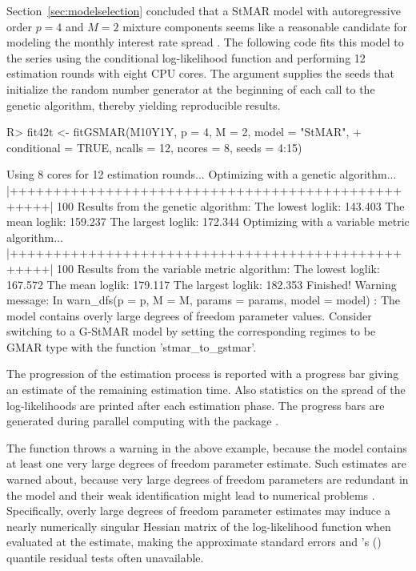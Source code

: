 \documentclass[nojss]{jss} %
\begin{document}
Section~\ref{sec:modelselection} concluded that a StMAR model with autoregressive order $p=4$ and $M=2$ mixture components seems like a reasonable candidate for modeling the monthly interest rate spread . The following code fits this model to the series using the conditional log-likelihood function and performing 12 estimation rounds with eight CPU cores. The argument  supplies the seeds that initialize the random number generator at the beginning of each call to the genetic algorithm, thereby yielding reproducible results.
%
\begin{CodeChunk}
\begin{CodeInput}
R> fit42t <- fitGSMAR(M10Y1Y, p = 4, M = 2, model = "StMAR",
+    conditional = TRUE, ncalls = 12, ncores = 8, seeds = 4:15)
\end{CodeInput}
\begin{CodeOutput}
Using 8 cores for 12 estimation rounds...
Optimizing with a genetic algorithm...
  |++++++++++++++++++++++++++++++++++++++++++++++++++| 100%
Results from the genetic algorithm:
The lowest loglik:  143.403
The mean loglik:    159.237
The largest loglik: 172.344
Optimizing with a variable metric algorithm...
  |++++++++++++++++++++++++++++++++++++++++++++++++++| 100%
Results from the variable metric algorithm:
The lowest loglik:  167.572
The mean loglik:    179.117
The largest loglik: 182.353
Finished!
Warning message:
In warn_dfs(p = p, M = M, params = params, model = model) :
  The model contains overly large degrees of freedom parameter values.
  Consider switching to a G-StMAR model by setting the corresponding regimes
  to be GMAR type with the function 'stmar_to_gstmar'.
\end{CodeOutput}
\end{CodeChunk}
%
The progression of the estimation process is reported with a progress bar giving an estimate of the remaining estimation time. Also statistics on the spread of the log-likelihoods are printed after each estimation phase. The progress bars are generated during parallel computing with the package  \citep{Solymos+Zawadzki:2020}.

The function throws a warning in the above example, because the model contains at least one very large degrees of freedom parameter estimate. Such estimates are warned about, because very large degrees of freedom parameters are redundant in the model and their weak identification might lead to numerical problems \citep[Section 4]{Virolainen:2020}. Specifically, overly large degrees of freedom parameter estimates may induce a nearly numerically singular Hessian matrix of the log-likelihood function when evaluated at the estimate, making the approximate standard errors and  \citeauthor{Kalliovirta:2012}'s (\citeyear{Kalliovirta:2012}) quantile residual tests often unavailable.
\end{document}
